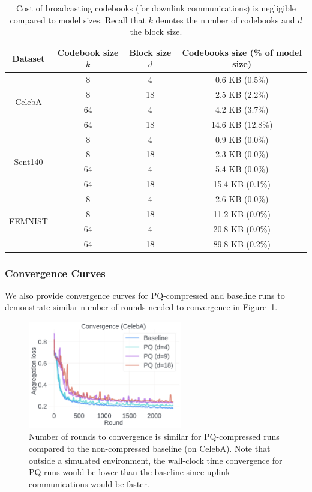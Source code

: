 \begin{table}[t]
     \caption{Cost of broadcasting codebooks (for downlink communications) is negligible compared to model sizes. Recall that $k$ denotes the number of codebooks and $d$ the block size.}
    \centering
    \vspace{3pt}
    \begin{tabular}{c|ccc}
    \toprule
    Dataset & Codebook size $k$ & Block size $d$ & Codebooks size (\% of model size) \\
    \midrule 
    \multirow{4}{*}{CelebA} & 8 & 4 & 0.6 KB (0.5\%) \\
    & 8 & 18 & 2.5 KB (2.2\%) \\
    & 64 & 4 & 4.2 KB (3.7\%) \\
    & 64 & 18 & 14.6 KB (12.8\%) \\
    \midrule
    \multirow{4}{*}{Sent140} & 8 & 4 & 0.9 KB (0.0\%) \\
    & 8 & 18 & 2.3 KB (0.0\%) \\
    & 64 & 4 & 5.4 KB (0.0\%) \\
    & 64 & 18 & 15.4 KB (0.1\%) \\
    \midrule
    \multirow{4}{*}{FEMNIST} & 8 & 4 & 2.6 KB (0.0\%) \\
    & 8 & 18 & 11.2 KB (0.0\%) \\
    & 64 & 4 & 20.8 KB (0.0\%) \\
    & 64 & 18 & 89.8 KB (0.2\%) \\
    \bottomrule
    \end{tabular}
    \label{tab:codebook_size}
\end{table}

\subsubsection{Convergence Curves}
\label{appendix:convergence}
We also provide convergence curves for PQ-compressed and baseline runs to demonstrate similar number of rounds needed to convergence in Figure~\ref{fig:loss}.

\begin{figure}[t]
    \centering
    \includegraphics[width=0.6\textwidth]{figs/loss.pdf}
    \caption{\label{fig:loss}
    Number of rounds to convergence is similar for PQ-compressed runs compared to the non-compressed baseline (on CelebA).
    Note that outside a simulated environment, the wall-clock time convergence for PQ runs would be lower than the baseline since uplink communications would be faster.}
\end{figure}

